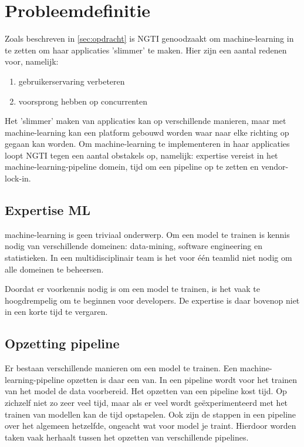 
\section{Probleemdefinitie}\label{sec:probleemdefinitie}
Zoals beschreven in \autoref{sec:opdracht} is NGTI genoodzaakt om \gls{machine-learning} in te zetten om haar applicaties 'slimmer' te maken. Hier zijn een aantal redenen voor, namelijk:
\begin{enumerate}
  \item gebruikerservaring verbeteren
  \item voorsprong hebben op concurrenten
\end{enumerate}

Het 'slimmer' maken van applicaties kan op verschillende manieren, maar met \gls{machine-learning} kan een platform gebouwd worden waar naar elke richting op gegaan kan worden. Om \gls{machine-learning} te implementeren in haar applicaties loopt NGTI tegen een aantal obstakels op, namelijk: expertise vereist in het \gls{machine-learning-pipeline} domein, tijd om een pipeline op te zetten en \gls{vendor-lock-in}.

\subsection{Expertise ML}\label{sec:expertise-vereist}
\Gls{machine-learning} is geen triviaal onderwerp. Om een model te trainen is kennis nodig van verschillende domeinen: \gls{data-mining}, software engineering en statistieken. In een multidisciplinair team is het voor één teamlid niet nodig om alle domeinen te beheersen.

Doordat er voorkennis nodig is om een model te trainen, is het vaak te hoogdrempelig om te beginnen voor developers. De expertise is daar bovenop niet in een korte tijd te vergaren.

\subsection{Opzetting pipeline}\label{sec:opzetten-pipeline}
Er bestaan verschillende manieren om een model te trainen. Een \gls{machine-learning-pipeline} opzetten is daar een van. In een pipeline wordt voor het trainen van het model de data voorbereid. Het opzetten van een pipeline kost tijd. Op zichzelf niet zo zeer veel tijd, maar als er veel wordt geëxperimenteerd met het trainen van modellen kan de tijd opstapelen. Ook zijn de stappen in een pipeline over het algemeen hetzelfde, ongeacht wat voor model je traint. Hierdoor worden taken vaak herhaalt tussen het opzetten van verschillende pipelines.

